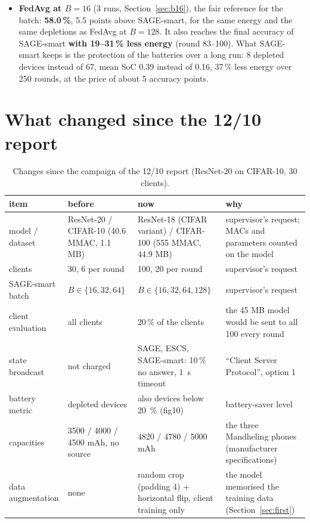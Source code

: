 \documentclass[11pt,a4paper]{article}
\begin{document}
\begin{itemize}
        saving and the battery protection; the staleness term and the small
        batch give the accuracy. The server-side SoC estimate, the negotiation
        and FedNova have no measurable effect in this scenario.
  \item \textbf{FedAvg at $B=16$} (3 runs, Section~\ref{sec:b16}), the fair
        reference for the batch: \textbf{58.0\,\%}, 5.5 points above SAGE-smart,
        for the same energy and the same depletions as FedAvg at $B=128$. It
        also reaches the final accuracy of SAGE-smart \textbf{with 19--31\,\%
        less energy} (round 83--100). What SAGE-smart keeps is the protection of
        the batteries over a long run: 8 depleted devices instead of 67, mean
        SoC 0.39 instead of 0.16, 37\,\% less energy over 250 rounds, at the
        price of about 5 accuracy points.
\end{itemize}

\section{What changed since the 12/10 report}

\begin{table}[H]
\centering
\small
\caption{Changes since the campaign of the 12/10 report (ResNet-20 on
CIFAR-10, 30 clients).}
\label{tab:changes}
\begin{tabular}{p{3.3cm}p{3.6cm}p{3.9cm}p{3.9cm}}
\toprule
item & before & now & why \\
\midrule
model / dataset & ResNet-20 / CIFAR-10 (40.6 MMAC, 1.1 MB) & ResNet-18 (CIFAR variant) / CIFAR-100 (555 MMAC, 44.9 MB) & supervisor's request; MACs and parameters counted on the model \\
clients & 30, 6 per round & 100, 20 per round & supervisor's request \\
SAGE-smart batch & $B\in\{16,32,64\}$ & $B\in\{16,32,64,128\}$ & supervisor's request \\
client evaluation & all clients & 20\,\% of the clients & the 45 MB model would be sent to all 100 every round \\
state broadcast & not charged & SAGE, ESCS, SAGE-smart: 10\,\% no answer, \SI{1}{\second} timeout & ``Client Server Protocol'', option 1 \\
battery metric & depleted devices & also devices below \SI{20}{\percent} (fig10) & battery-saver level \\
capacities & 3500 / 4000 / 4500 mAh, no source & 4820 / 4780 / 5000 mAh & the three Mandheling phones (manufacturer specifications) \\
data augmentation & none & random crop (padding 4) + horizontal flip, client training only & the model memorised the training data (Section~\ref{sec:first}) \\
\bottomrule
\end{tabular}
\end{table}
\end{document}
